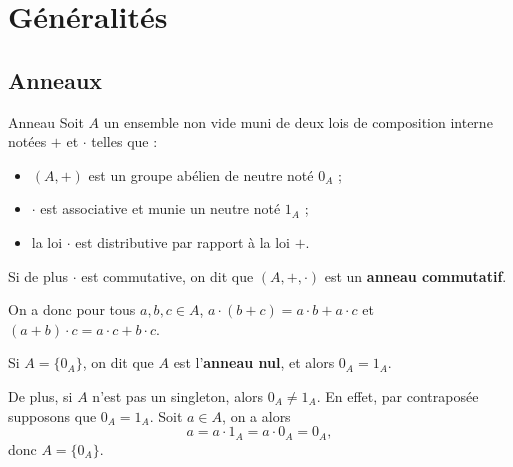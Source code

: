 \section{Généralités}
\subsection{Anneaux}

\begin{definition}{Anneau}{}
    Soit $A$ un ensemble non vide muni de deux lois de composition interne notées $+$ et
    $\cdot$ telles que : 
    \begin{itemize}
        \item $(A, +)$ est un groupe abélien de neutre noté $0_A$ ;
        \item $\cdot$ est associative et munie un neutre noté $1_A$ ;
        \item la loi $\cdot$ est distributive par rapport à la loi $+$.
    \end{itemize}
    Si de plus $\cdot$ est commutative, on dit que $(A, +, \cdot)$ est un \textbf{anneau commutatif}.
\end{definition}

\begin{remarque}
    On a donc pour tous $a, b, c \in A$, $a \cdot (b + c) = a \cdot b + a \cdot c$ et 
    $(a + b) \cdot c = a \cdot c + b \cdot c$.
\end{remarque}

\begin{remarque}
    Si $A = \{0_A\}$, on dit que $A$ est l'\textbf{anneau nul}, et 
    alors $0_A = 1_A$.

    De plus, si $A$ n'est pas un singleton, alors $0_A \neq 1_A$. En effet, 
    par contraposée supposons que $0_A = 1_A$. Soit $a \in A$, on a alors 
    \[
        a = a \cdot 1_A = a \cdot 0_A = 0_A,
    \]
    donc $A = \{0_A\}$.
\end{remarque}

